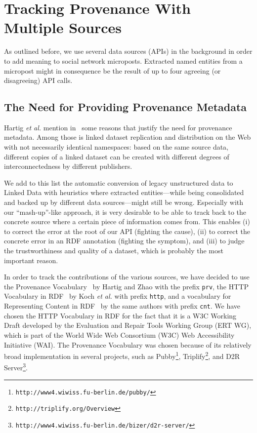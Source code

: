 \section{Tracking Provenance With Multiple Sources}                    \label{sec:tracking}
As outlined before, we use several data sources (APIs) in the background in order to add meaning to social network microposts. Extracted named entities from a micropost might in consequence be the result of up to four agreeing (or disagreeing) API calls. 

\subsection{The Need for Providing Provenance Metadata}
Hartig \emph{et al.} mention in~\cite{ipaw10:olaf} some reasons that justify the need for provenance metadata. Among those is linked dataset replication and distribution on the Web with not necessarily identical namespaces: based on the same source data, different copies of a linked dataset can be created with different degrees of interconnectedness by different publishers.

We add to this list the automatic conversion of legacy unstructured data to Linked Data with heuristics where extracted entities---while being consolidated and backed up by different data sources---might still be wrong. Especially with our ``mash-up''-like approach, it is very desirable to be able to track back to the concrete source where a certain piece of information comes from. This enables (i) to correct the error at the root of our API (fighting the cause), (ii) to correct the concrete error in an RDF annotation (fighting the symptom), and (iii) to judge the trustworthiness and quality of a dataset, which is probably the most important reason.

In order to track the contributions of the various sources, we have decided to use the Provenance Vocabulary~\cite{Hartig:Provenance} by Hartig and Zhao with the prefix \texttt{prv}, the HTTP Vocabulary in RDF~\cite{HTTP:RDF} by Koch \emph{et al.} with prefix \texttt{http}, and a vocabulary for Representing Content in RDF~\cite{CNT:RDF} by the same authors with prefix \texttt{cnt}. We have chosen the HTTP Vocabulary in RDF for the fact that it is a W3C Working Draft  developed by the Evaluation and Repair Tools Working Group (ERT WG), which is part of the World Wide Web Consortium (W3C) Web Accessibility Initiative (WAI). The Provenance Vocabulary was chosen because of its relatively broad implementation in several projects, such as Pubby\footnote{\texttt{http://www4.wiwiss.fu-berlin.de/pubby/}}, Triplify\footnote{\texttt{http://triplify.org/Overview}}, and D2R Server\footnote{\texttt{http://www4.wiwiss.fu-berlin.de/bizer/d2r-server/}}.

